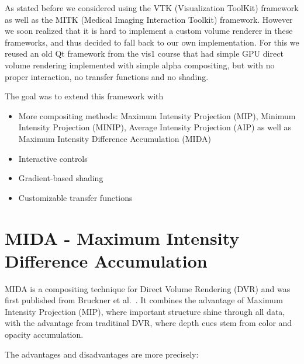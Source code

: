 As stated before we considered using the VTK (Visualization ToolKit) framework as well as the MITK (Medical Imaging Interaction Toolkit) framework. However we soon realized that it is hard to implement a custom volume renderer in these frameworks, and thus decided to fall back to our own implementation. For this we reused an old Qt framework from the vis1 course that had simple GPU direct volume rendering implemented with simple alpha compositing, but with no proper interaction, no transfer functions and no shading.

The goal was to extend this framework with
\begin{itemize}
	\item More compositing methods: Maximum Intensity Projection (MIP), Minimum Intensity Projection (MINIP), Average Intensity Projection (AIP) as well as Maximum Intensity Difference Accumulation (MIDA)
	\item Interactive controls
	\item Gradient-based shading
	\item Customizable transfer functions
\end{itemize}




\section{MIDA  - Maximum Intensity Difference Accumulation}

MIDA is a compositing technique for Direct Volume Rendering (DVR) and was first published from Bruckner et al.~\cite{bruckner2009instant}.
It combines the advantage of Maximum Intensity Projection (MIP), where important structure shine through all data, 
with the advantage from traditinal DVR, where depth cues stem from color and opacity accumulation.

The advantages and disadvantages are more precisely:

